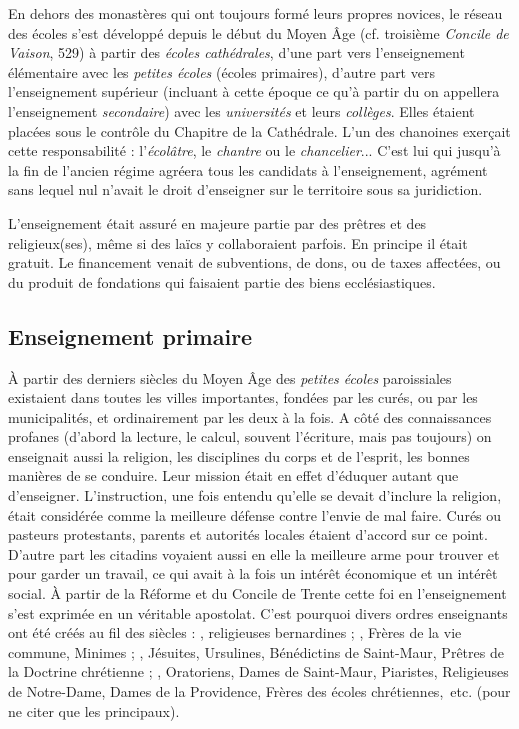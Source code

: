  
En dehors des monastères qui ont toujours formé leurs propres novices, le réseau des écoles s'est développé depuis le début du Moyen Âge (cf. troisième \emph{Concile de Vaison}, 529) à partir des \emph{écoles cathédrales}, d'une part vers l'enseignement élémentaire avec les \emph{petites écoles} (écoles primaires), d'autre part vers l'enseignement supérieur (incluant à cette époque ce qu'à partir du  on appellera l'enseignement \emph{secondaire}) avec les \emph{universités} et leurs \emph{collèges}.  Elles étaient placées sous le contrôle du Chapitre de la Cathédrale. L'un des chanoines exerçait cette responsabilité : l'\emph{écolâtre},  le \emph{chantre} ou le \emph{chancelier}... C'est lui qui jusqu'à la fin de l'ancien régime agréera tous les candidats à l'enseignement, agrément sans lequel nul n'avait le droit d'enseigner sur le territoire sous sa juridiction.

L'enseignement était assuré en majeure partie par des prêtres et des religieux(ses), même si des laïcs y collaboraient parfois. En principe il était gratuit. Le financement venait de subventions, de dons, ou de taxes affectées, ou du produit de fondations qui faisaient partie des biens ecclésiastiques.

\subsection{Enseignement primaire}

À partir des derniers siècles du Moyen Âge des \emph{petites écoles} paroissiales existaient dans toutes les villes importantes, fondées par les curés, ou par les municipalités, et ordinairement par les deux à la fois. A côté des connaissances profanes (d'abord la lecture, le calcul, souvent l'écriture, mais pas toujours) on enseignait aussi la religion, les disciplines du corps et de l'esprit, les bonnes manières de se conduire. Leur mission était en effet d'éduquer autant que d'enseigner. L'instruction, une fois entendu qu'elle se devait d'inclure la religion, était considérée comme la meilleure défense contre l'envie de mal faire. Curés ou pasteurs protestants, parents et autorités locales étaient d'accord sur ce point. D'autre part les citadins voyaient aussi en elle la meilleure arme pour trouver et pour garder un travail, ce qui avait à la fois un intérêt économique et un intérêt social. À partir de la Réforme et du Concile de Trente cette foi en l'enseignement s'est exprimée en un véritable apostolat. C'est pourquoi divers ordres enseignants ont été créés au fil des siècles :
, religieuses bernardines ;
, Frères de la vie commune, Minimes ;
, Jésuites, Ursulines, Bénédictins de Saint-Maur, Prêtres de la Doctrine chrétienne ;
, Oratoriens, Dames de Saint-Maur, Piaristes, Religieuses de Notre-Dame, Dames de la Providence, Frères des écoles chrétiennes,~etc. (pour ne citer que les principaux).

